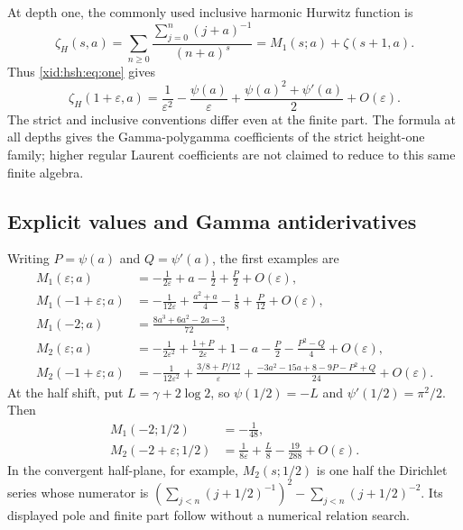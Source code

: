 At depth one, the commonly used inclusive harmonic Hurwitz function is
\[
 \zeta_H(s,a)=\sum_{n\ge0}\frac{\sum_{j=0}^{n}(j+a)^{-1}}{(n+a)^s}
            =M_1(s;a)+\zeta(s+1,a).
\]
Thus \eqref{xid:hsh:eq:one} gives
\[
 \zeta_H(1+\varepsilon,a)
 =\frac1{\varepsilon^2}-\frac{\psi(a)}{\varepsilon}
       +\frac{\psi(a)^2+\psi'(a)}2+O(\varepsilon).
\]
The strict and inclusive conventions differ even at the finite part.
The formula at all depths gives the Gamma-polygamma coefficients of the
strict height-one family; higher regular Laurent coefficients are not
claimed to reduce to this same finite algebra.

\subsection{Explicit values and Gamma antiderivatives}

Writing $P=\psi(a)$ and $Q=\psi'(a)$, the first examples are
\begin{align}
 M_1(\varepsilon;a)
  &=-\frac1{2\varepsilon}+a-\frac12+\frac P2+O(\varepsilon),
       \label{xid:hsh:eq:M10}\\
 M_1(-1+\varepsilon;a)
  &=-\frac1{12\varepsilon}
       +\frac{a^2+a}{4}-\frac18+\frac P{12}+O(\varepsilon),\\
 M_1(-2;a)&=\frac{8a^3+6a^2-2a-3}{72},
       \label{xid:hsh:eq:M12}\\
 M_2(\varepsilon;a)
  &=-\frac1{2\varepsilon^2}+\frac{1+P}{2\varepsilon}
       +1-a-\frac P2-\frac{P^2-Q}{4}+O(\varepsilon),\\
 M_2(-1+\varepsilon;a)
  &=-\frac1{12\varepsilon^2}
       +\frac{3/8+P/12}{\varepsilon}
       +\frac{-3a^2-15a+8-9P-P^2+Q}{24}
       +O(\varepsilon).\label{xid:hsh:eq:M21}
\end{align}
At the half shift, put $L=\gamma+2\log2$, so
$\psi(1/2)=-L$ and $\psi'(1/2)=\pi^2/2$. Then
\begin{align}
 M_1(-2;1/2)&=-\frac1{48},\\
 M_2(-2+\varepsilon;1/2)
       &=\frac1{8\varepsilon}+\frac L8-\frac{19}{288}
                    +O(\varepsilon).
\end{align}
In the convergent half-plane, for example,
$M_2(s;1/2)$ is one half the Dirichlet series whose numerator is
$(\sum_{j<n}(j+1/2)^{-1})^2-\sum_{j<n}(j+1/2)^{-2}$.
Its displayed pole and finite part follow without a numerical relation search.

